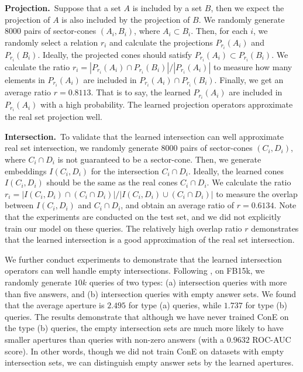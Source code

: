 \documentclass{article}
\newcommand{\udfsection}[1]{\noindent\textbf{#1}\, }
\begin{document}
\udfsection{Projection.} 
Suppose that a set $A$ is included by a set $B$, then we expect the projection of $A$ is also included by the projection of $B$. We randomly generate 8000 pairs of sector-cones $(A_i, B_i)$, where $A_i\subset B_i$. Then, for each $i$, we randomly select a relation $r_i$ and calculate the projections $P_{r_i}(A_i)$ and $P_{r_i}(B_i)$. Ideally, the projected cones should satisfy $P_{r_i}(A_i)\subset P_{r_i}(B_i)$. We calculate the ratio $r_i=|P_{r_i}(A_i)\cap P_{r_i}(B_i)|/|P_{r_i}(A_i)|$ to measure how many elements in $P_{r_i}(A_i)$ are included in $P_{r_i}(A_i)\cap P_{r_i}(B_i)$. Finally, we get an average ratio $r=0.8113$. That is to say, the learned  $P_{r_i}(A_i)$ are included in $P_{r_i}(A_i)$ with a high probability. The learned projection operators approximate the real set projection well.

\udfsection{Intersection.}
To validate that the learned intersection can well approximate real set intersection, we randomly generate 8000 pairs of sector-cones $(C_i, D_i)$, where $C_i\cap D_i$ is not guaranteed to be a sector-cone. Then, we generate embeddings $I(C_i, D_i)$ for the intersection $C_i\cap D_i$. Ideally, the learned cones $I(C_i, D_i)$ should be the same as the real cones $C_i\cap D_i$. We calculate the ratio $r_i=|I(C_i, D_i)\cap (C_i\cap D_i)|/|I(C_i, D_i)\cup (C_i\cap D_i)|$ to measure the overlap between $I(C_i, D_i)$ and $C_i\cap D_i$, and obtain an average ratio of $r=0.6134$. Note that the experiments are conducted on the test set, and we did not explicitly train our model on these queries. The relatively high overlap ratio $r$ demonstrates that the learned intersection is a good approximation of the real set intersection.

We further conduct experiments to demonstrate that the learned intersection operators can well handle empty intersections. Following \citet{q2b}, on FB15k, we randomly generate $10k$ queries of two types: (a) intersection queries with more than five answers, and (b) intersection queries with empty answer sets. We found that the average aperture is $2.495$ for type (a) queries, while $1.737$ for type (b) queries. The results demonstrate that although we have never trained ConE on the type (b) queries, the empty intersection sets are much more likely to have smaller apertures than queries with non-zero answers (with a $0.9632$ ROC-AUC score). In other words, though we did not train ConE on datasets with empty intersection sets, we can distinguish empty answer sets by the learned apertures.
\end{document}
